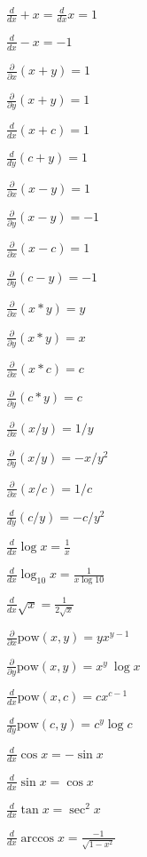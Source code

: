 \documentclass{article}
\begin{document}
$\frac{d}{dx} +x = \frac{d}{dx} x = 1$
\pagebreak

$\frac{d}{dx} -x = -1$
\pagebreak

$\frac{\partial}{\partial x} (x+y) = 1$
\pagebreak

$\frac{\partial}{\partial y} (x+y) = 1$
\pagebreak

$\frac{d}{dx} (x + c) = 1$
\pagebreak

$\frac{d}{dy} (c + y) = 1$
\pagebreak

$\frac{\partial}{\partial x} (x-y) = 1$
\pagebreak

$\frac{\partial}{\partial y} (x-y) = -1$
\pagebreak

$\frac{\partial}{\partial x} (x-c) = 1$
\pagebreak

$\frac{\partial}{\partial y} (c-y) = -1$
\pagebreak

$\frac{\partial}{\partial x} (x * y) = y$
\pagebreak

$\frac{\partial}{\partial y} (x * y) = x$
\pagebreak

$\frac{\partial}{\partial x} (x * c) = c$
\pagebreak

$\frac{\partial}{\partial y} (c * y) = c$
\pagebreak

$\frac{\partial}{\partial x} (x/y) = 1/y$
\pagebreak

$\frac{\partial}{\partial y} (x/y) = -x / y^2$
\pagebreak

$\frac{\partial}{\partial x} (x/c) = 1/c$
\pagebreak

$\frac{d}{d y} (c/y) = -c / y^2$
\pagebreak

$\frac{d}{dx} \log x = \frac{1}{x}$
\pagebreak

$\frac{d}{dx} \log_{10} x = \frac{1}{x \log 10}$
\pagebreak

$\frac{d}{dx} \sqrt{x} = \frac{1}{2 \sqrt{x}}$
\pagebreak

$\frac{\partial}{\partial x} \mbox{pow}(x,y) = y x^{y-1}$
\pagebreak

$\frac{\partial}{\partial y} \mbox{pow}(x,y) = x^y \ \log x$
\pagebreak

$\frac{d}{dx} \mbox{pow}(x,c) = c x^{c-1}$
\pagebreak

$\frac{d}{d y} \mbox{pow}(c,y) = c^y \log c $
\pagebreak

$\frac{d}{dx} \cos x = - \sin x$
\pagebreak

$\frac{d}{dx} \sin x = \cos x$
\pagebreak

$\frac{d}{dx} \tan x = \sec^2 x$
\pagebreak

$\frac{d}{dx} \arccos x = \frac{-1}{\sqrt{1 - x^2}}$
\pagebreak
\end{document}
